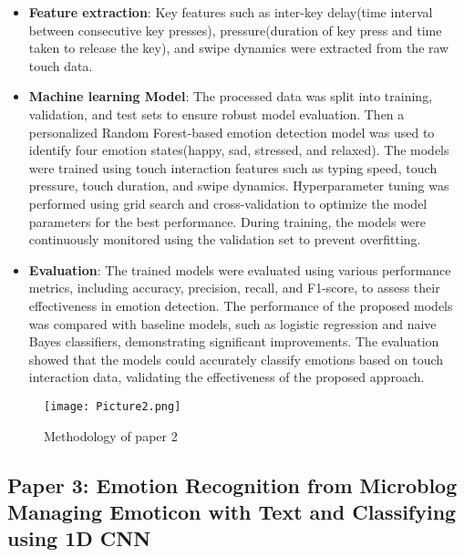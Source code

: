 \documentclass[12pt]{article} %
\begin{document}
                                                                               
  
\begin{itemize}
    \item \textbf{Feature extraction}:
     Key features such as inter-key delay(time interval between consecutive key presses), pressure(duration of key press and time taken to release the key), and swipe dynamics were extracted from the raw touch data.
\end{itemize} 

\begin{itemize}
    \item \textbf{Machine learning Model}:
    The processed data was split into training, validation, and test sets to ensure robust model evaluation. Then a personalized Random Forest-based emotion detection model was used to identify four emotion states(happy, sad, stressed, and relaxed). The models were trained using touch interaction features such as typing speed, touch pressure, touch duration, and swipe dynamics. Hyperparameter tuning was performed using grid search and cross-validation to optimize the model parameters for the best performance. During training, the models were continuously monitored using the validation set to prevent overfitting.
\end{itemize}
\begin{itemize}
    \item \textbf{Evaluation}:
    The trained models were evaluated using various performance metrics, including accuracy, precision, recall, and F1-score, to assess their effectiveness in emotion detection. The performance of the proposed models was compared with baseline models, such as logistic regression and naive Bayes classifiers, demonstrating significant improvements. The evaluation showed that the models could accurately classify emotions based on touch interaction data, validating the effectiveness of the proposed approach.
\end{itemize}

    \begin{figure}[h!]
    \centering
    \texttt{[image: Picture2.png]}                    
    \caption{Methodology of paper 2 }                                                  
  
    \label{Methodology of paper 2}
    \end{figure} 

\subsection{Paper 3: Emotion Recognition from Microblog Managing Emoticon with Text and Classifying using 1D CNN }                                        
  
\end{document}
